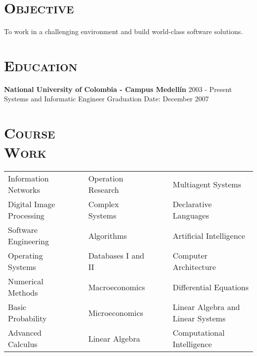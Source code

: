 \begin{resume}



\section{\textsc{Objective}}
To work in a challenging environment and build world-class software solutions.



\section{\textsc{Education}}
\textbf{National University of Colombia - Campus Medell\'{i}n} \hfill 2003 - Present \\
{Systems and Informatic Engineer} \hfill Graduation Date: December 2007\\
\newline

\section{\textsc{Course\\ Work}}
  \begin{tabular}{lllll}
Information Networks   & \ \ &  Operation Research   & \ \ &
Multiagent Systems  \\ 
Digital Image Processing     & \ \ & Complex Systems  & \ \ & Declarative Languages \\
Software Engineering   & \ \ & Algorithms          & \ \ & Artificial Intelligence     \\
Operating Systems      & \ \ & Databases I and II          & \ \ & Computer Architecture \\
Numerical Methods      & \ \ & Macroeconomics       & \ \ & Differential Equations      \\
Basic Probability      & \ \ & Microeconomics      & \ \ & Linear Algebra and Linear Systems      \\
Advanced Calculus      & \ \ & Linear Algebra    & \ \ & Computational Intelligence   \\
\end{tabular}
\newline


\end{resume}
